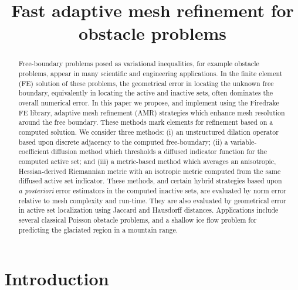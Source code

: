 \documentclass[]{interact}
\theoremstyle{plain}%
\theoremstyle{definition}
\theoremstyle{remark}
\begin{document}

\title{Fast adaptive mesh refinement for obstacle problems}

\author{
}

\maketitle

\begin{abstract}
Free-boundary problems posed as variational inequalities, for example obstacle problems, appear in many scientific and engineering applications.  In the finite element (FE) solution of these problems, the geometrical error in locating the unknown free boundary, equivalently in locating the active and inactive sets, often dominates the overall numerical error.  In this paper we propose, and implement using the Firedrake FE library, adaptive mesh refinement (AMR) strategies which enhance mesh resolution around the free boundary.  These methods mark elements for refinement based on a computed solution.  We consider three methods: (i) an unstructured dilation operator based upon discrete adjacency to the computed free-boundary; (ii) a variable-coefficient diffusion method which thresholds a diffused indicator function for the computed active set; and (iii) a metric-based method which averages an anisotropic, Hessian-derived Riemannian metric with an isotropic metric computed from the same diffused active set indicator.  These methods, and certain hybrid strategies based upon \emph{a posteriori} error estimators in the computed inactive sets, are evaluated by norm error relative to mesh complexity and run-time.  They are also evaluated by geometrical error in active set localization using Jaccard and Hausdorff distances.  Applications include several classical Poisson obstacle problems, and a shallow ice flow problem for predicting the glaciated region in a mountain range.
\end{abstract}



\section{Introduction} \label{sec:intro}
\end{document}
